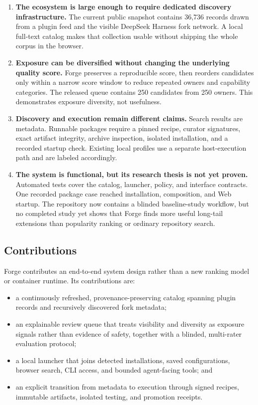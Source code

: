 \documentclass[10pt,twocolumn]{article}
\begin{document}
\begin{enumerate}
\item \textbf{The ecosystem is large enough to require dedicated discovery infrastructure.} The current public snapshot contains 36,736 records drawn from a plugin feed and the visible DeepSeek Harness fork network. A local full-text catalog makes that collection usable without shipping the whole corpus in the browser.\cite{registry,catalogstore,feedrelease}

\item \textbf{Exposure can be diversified without changing the underlying quality score.} Forge preserves a reproducible score, then reorders candidates only within a narrow score window to reduce repeated owners and capability categories. The released queue contains 250 candidates from 250 owners. This demonstrates exposure diversity, not usefulness.\cite{research,feedrelease}

\item \textbf{Discovery and execution remain different claims.} Search results are metadata. Runnable packages require a pinned recipe, curator signatures, exact artifact integrity, archive inspection, isolated installation, and a recorded startup check. Existing local profiles use a separate host-execution path and are labeled accordingly.\cite{signedpackages,installation,profiles}

\item \textbf{The system is functional, but its research thesis is not yet proven.} Automated tests cover the catalog, launcher, policy, and interface contracts. One recorded package case reached installation, composition, and Web startup. The repository now contains a blinded baseline-study workflow, but no completed study yet shows that Forge finds more useful long-tail extensions than popularity ranking or ordinary repository search.\cite{ci,catalogci,agentteams,research}
\end{enumerate}

\subsection{Contributions}

Forge contributes an end-to-end system design rather than a new ranking model or container runtime. Its contributions are:

\begin{itemize}
\item a continuously refreshed, provenance-preserving catalog spanning plugin records and recursively discovered fork metadata;
\item an explainable review queue that treats visibility and diversity as exposure signals rather than evidence of safety, together with a blinded, multi-rater evaluation protocol;
\item a local launcher that joins detected installations, saved configurations, browser search, CLI access, and bounded agent-facing tools; and
\item an explicit transition from metadata to execution through signed recipes, immutable artifacts, isolated testing, and promotion receipts.
\end{itemize}
\end{document}
